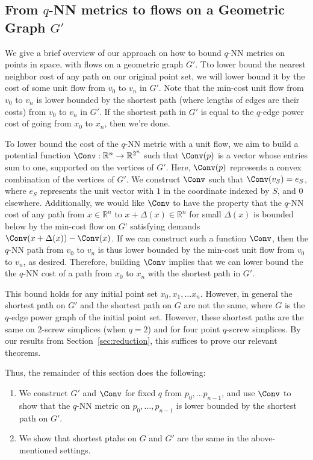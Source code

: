 \subsection{From $q$-NN metrics to flows on a Geometric Graph $G'$}

We give a brief overview of our approach on how to bound $q$-NN metrics on
points in space, with flows on a geometric graph $G'$.  
Tto lower bound the nearest neighbor cost of any path on our original point
set, we will lower bound it by the cost of some unit flow from
$v_0$ to $v_n$ in $G'$. Note that the min-cost
unit flow from $v_0$ to $v_n$ is lower bounded by the shortest path (where
lengths of edges are their costs) from $v_0$ to $v_n$ in $G'$.
If the shortest path in $G'$ is equal to the $q$-edge power cost of going
from $x_0$ to $x_n$, then we're done.

To lower bound the cost of the $q$-NN metric with a unit flow, we aim to build
a potential function $\Conv:\mathbb{R}^n \rightarrow \mathbb{R}^{2^n}$ such
that $\Conv(p)$ is a vector whose entries sum to one, supported on the
vertices of $G'$. Here, $\Conv(p)$
represents a convex combination of the vertices of $G'$. We construct $\Conv$
such that $\Conv(v_S) = e_S$, where $e_S$ represents the unit vector with $1$
in the coordinate indexed by $S$, and $0$ elsewhere. Additionally, we would
like $\Conv$ to have
the property that the $q$-NN cost of any path from $x \in \mathbb{R}^n$ to
$x+\Delta(x) \in \mathbb{R}^n$ for small $\Delta(x)$ is
bounded below by the min-cost flow on $G’$ satisfying demands
$\Conv(x+\Delta(x)) - \Conv(x)$. If we can construct such a function $\Conv$,
then the $q$-NN path from $v_0$ to $v_n$ is thus lower bounded by the min-cost
unit flow from $v_0$ to $v_n$, as desired.
 Therefore, building $\Conv$ implies that we can lower bound the
the $q$-NN cost of a path from $x_0$ to $x_n$ with the shortest path in $G'$.

This bound holds for any initial point set $x_0, x_1, \ldots x_n$. However,
in general the shortest path on $G'$ and the shortest path on $G$ are not
the same, where $G$ is the $q$-edge power graph of the initial point set.
However, these shortest paths are the same
on $2$-screw simplices (when $q=2$) and for four point $q$-screw
simplices. By our results from Section~\ref{sec:reduction}, this suffices
to prove our relevant theorems.

Thus, the remainder of this section does the following: 
\begin{enumerate}
\item We construct $G'$ and $\Conv$ for fixed $q$ from $p_0, \ldots
p_{n-1}$, and use $\Conv$ to show that the $q$-NN metric on $p_0, \ldots,
p_{n-1}$ is lower bounded by the shortest path on $G'$.
\item We show that shortest ptahs on $G$ and $G'$ are the same in the
above-mentioned settings.
\end{enumerate}

